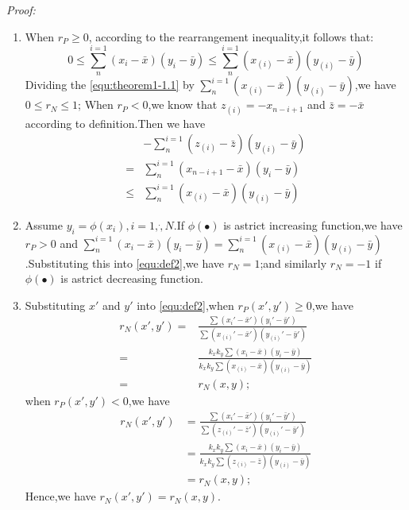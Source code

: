 \documentclass[journal]{IEEEtran}
\begin{document}
    \emph{Proof:}
    \begin{enumerate}
      \item When $r_{P}\geq 0$, according to the rearrangement inequality,it follows that:
        \begin{equation}\label{equ:theorem1-1.1}
          0\leq \sum_{n}^{i=1}(x_{i}-\bar{x})(y_{i}-\bar{y})\leq \sum_{n}^{i=1}(x_{(i)}-\bar{x})(y_{(i)}-\bar{y})
        \end{equation}
        Dividing the \ref{equ:theorem1-1.1} by $\sum_{n}^{i=1}(x_{(i)}-\bar{x})(y_{(i)}-\bar{y})$,we have $0\leq r_{N}\leq 1$;
        When $r_{P}<0$,we know that $z_{(i)}=-x_{{n-i+1}}$ and $\bar{z}=-\bar{x}$ according to definition.Then we have
        \begin{equation}\label{equ:theorom1-1.2}
          \begin{split}
               & -\sum_{n}^{i=1}(z_{(i)}-\bar{z})(y_{(i)}-\bar{y}) \\
             = & \sum_{n}^{i=1}(x_{n-i+1}-\bar{x})(y_{i}-\bar{y}) \\
             \leq & \sum_{n}^{i=1}(x_{(i)}-\bar{x})(y_{(i)}-\bar{y})
          \end{split}
        \end{equation}

      \item Assume $y_{i}=\phi (x_{i}),i=1,\dot,N$.If $\phi(\bullet)$ is astrict increasing function,we have $r_{P}>0$ and $\sum_{n}^{i=1}(x_{i}-\bar{x})(y_{i}-\bar{y})=\sum_{n}^{i=1}(x_{(i)}-\bar{x})(y_{(i)}-\bar{y})$.Substituting this into \ref{equ:def2},we have $r_{N}=1$;and similarly $r_{N}=-1$ if $\phi(\bullet)$ is astrict decreasing function.

      \item Substituting ${x}'$ and ${y}'$ into \ref{equ:def2},when $r_{P}({x}',{y}')\geq 0$,we have
        \begin{equation}\label{equ:theorom1-3.1}
          \begin{split}
             r_{N}({x}',{y}') =& \frac{\sum({x_{i}}'-{\bar{x}}')({y_{i}}'-{\bar{y}}')}{\sum({x_{(i)}}'-{\bar{x}}')({y_{(i)}}'-{\bar{y}}')} \\
                              =& \frac{k_{x}k_{y}\sum(x_{i}-\bar{x})(y_{i}-\bar{y})}{k_{x}k_{y}\sum(x_{(i)}-\bar{x})(y_{(i)}-\bar{y})} \\
                              =& r_{N}(x,y);
          \end{split}
        \end{equation}
        when $r_{P}({x}',{y}')<0$,we have
        \begin{equation}\label{equ:theorom1-3.2}
          \begin{split}
             r_{N}({x}',{y}') & =\frac{\sum({x_{i}}'-{\bar{x}}')({y_{i}}'-{\bar{y}}')}{\sum({z_{(i)}}'-{\bar{z}}')({y_{(i)}}'-{\bar{y}}')} \\
               & =\frac{k_{x}k_{y}\sum(x_{i}-\bar{x})(y_{i}-\bar{y})}{k_{x}k_{y}\sum(z_{(i)}-\bar{z})(y_{(i)}-\bar{y})} \\
               & =r_{N}(x,y);
          \end{split}
        \end{equation}
        Hence,we have $r_{N}({x}',{y}')=r_{N}(x,y)$.


\end{enumerate}
\end{document}
